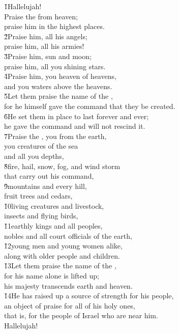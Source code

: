 \begin{poetry}
\poeml \v{1}Hallelujah! \\
\poemll    Praise the  from heaven; \\
\poemlll       praise him in the highest places. \\
\poeml \v{2}Praise him, all his angels; \\
\poemll    praise him, all his armies! \\
\poeml \v{3}Praise him, sun and moon; \\
\poemll    praise him, all you shining stars. \\
\poeml \v{4}Praise him, you heaven of heavens, \\
\poemll    and you waters above the heavens. \\
\poeml \v{5}Let them praise the name of the , \\
\poemll    for he himself gave the command that they be created. \\
\poeml \v{6}He set them in place to last forever and ever; \\
\poemll    he gave the command and will not rescind it. \\
\poeml \v{7}Praise the , you from the earth, \\
\poemll    you creatures of the sea \\
\poemlll       and all you depths, \\
\poeml \v{8}fire, hail, snow, fog, and wind storm \\
\poemll    that carry out his command, \\
\poeml \v{9}mountains and every hill, \\
\poemll    fruit trees and cedars, \\
\poeml \v{10}living creatures and livestock, \\
\poemll    insects and flying birds, \\
\poeml \v{11}earthly kings and all peoples, \\
\poemll    nobles and all court officials of the earth, \\
\poeml \v{12}young men and young women alike, \\
\poemll    along with older people and children. \\
\poeml \v{13}Let them praise the name of the , \\
\poemll    for his name alone is lifted up; \\
\poemlll       his majesty transcends earth and heaven. \\
\poeml \v{14}He has raised up a source of strength for his people, \\
\poemll    an object of praise for all of his holy ones, \\
\poemlll       that is, for the people of Israel who are near him. \\
\poeml Hallelujah!
\end{poetry}

